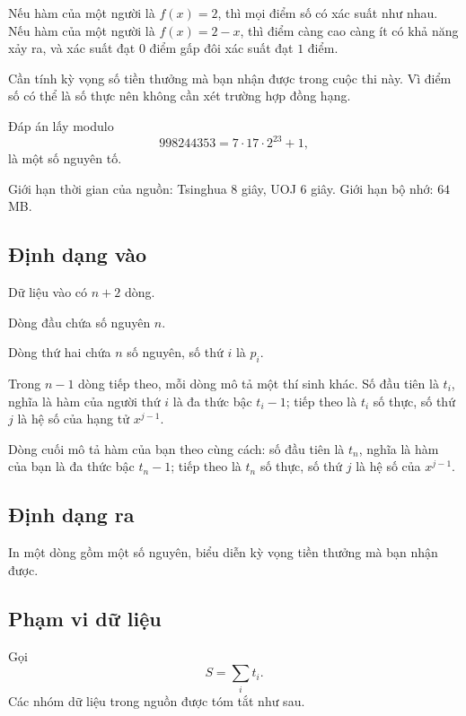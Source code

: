 \documentclass[11pt]{article}
\begin{document}
Nếu hàm của một người là \(f(x)=2\), thì mọi điểm số có xác suất như nhau. Nếu
hàm của một người là \(f(x)=2-x\), thì điểm càng cao càng ít có khả năng xảy
ra, và xác suất đạt \(0\) điểm gấp đôi xác suất đạt \(1\) điểm.

Cần tính kỳ vọng số tiền thưởng mà bạn nhận được trong cuộc thi này. Vì điểm số
có thể là số thực nên không cần xét trường hợp đồng hạng.

Đáp án lấy modulo
\[
  998244353=7\cdot 17\cdot 2^{23}+1,
\]
là một số nguyên tố.

Giới hạn thời gian của nguồn: Tsinghua \(8\) giây, UOJ \(6\) giây. Giới hạn bộ
nhớ: \(64\) MB.

\subsection{Định dạng vào}

Dữ liệu vào có \(n+2\) dòng.

Dòng đầu chứa số nguyên \(n\).

Dòng thứ hai chứa \(n\) số nguyên, số thứ \(i\) là \(p_i\).

Trong \(n-1\) dòng tiếp theo, mỗi dòng mô tả một thí sinh khác. Số đầu tiên là
\(t_i\), nghĩa là hàm của người thứ \(i\) là đa thức bậc \(t_i-1\); tiếp theo là
\(t_i\) số thực, số thứ \(j\) là hệ số của hạng tử \(x^{j-1}\).

Dòng cuối mô tả hàm của bạn theo cùng cách: số đầu tiên là \(t_n\), nghĩa là hàm
của bạn là đa thức bậc \(t_n-1\); tiếp theo là \(t_n\) số thực, số thứ \(j\) là
hệ số của \(x^{j-1}\).

\subsection{Định dạng ra}

In một dòng gồm một số nguyên, biểu diễn kỳ vọng tiền thưởng mà bạn nhận được.

\subsection{Phạm vi dữ liệu}

Gọi
\[
  S=\sum_i t_i.
\]
Các nhóm dữ liệu trong nguồn được tóm tắt như sau.
\end{document}
